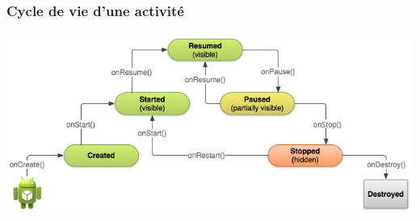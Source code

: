 \documentclass{beamer}
\begin{document}
\begin{frame}

\frametitle{Cycle de vie d'une activité}

\begin{center}
\includegraphics[scale=0.5]{basic-lifecycle.png}
\end{center}
\end{frame}
\end{document}

